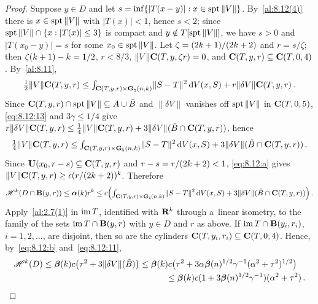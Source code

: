 \begin{proof}
    Suppose $y \in D$ and let $s = \inf \{ |T(x - y)| : x \in \operatorname{spt} \|V\| \}$. By~\ref{al:8.12(4)}
    there is $x \in \operatorname{spt} \|V\|$ with $|T(x)| < 1$, hence $s < 2$; since $\operatorname{spt} \|V\| \cap \{ x :
    |T(x)| \le 3 \}$ is compact and $y \notin T[\operatorname{spt} \|V\|]$, we have $s > 0$ and $|T(x_0 - y)| =
    s$ for some $x_0 \in \operatorname{spt} \|V\|$. Let $\zeta = (2k + 1)/(2 k + 2)$ and $r = s / \zeta$;
    then $\zeta (k + 1) - k = 1/2$, $r < 8/3$, $\|V\| \mathbf{C} ( T, y, \zeta r ) = 0$, and
    $\mathbf{C} ( T, y, r ) \subseteq \mathbf{C} ( T, 0, 4 )$. By~\ref{al:8.11},
    \begin{displaymath}
        \tfrac12 \|V\| \mathbf{C} ( T, y, r ) \le {\textstyle\int_{\mathbf{C} ( T, y, r ) \times
        \mathbf{G}_{\natural}(n,k)}^{}} \|S - T\|^2 \,\mathrm{d} V(x,S) + r \|\delta V\| \mathbf{C} ( T, y, r ) \,.
    \end{displaymath}
    Since $\mathbf{C} ( T, y, r ) \cap \operatorname{spt} \|V\| \subseteq A \cup \tilde B$ and $\|\delta V\|$ vanishes
    off $\operatorname{spt} \|V\|$ in $\mathbf{C} ( T, 0, 5 )$, \eqref{eq:8.12:13} and $3 \gamma \le 1/4$ give $r
    \|\delta V\| \mathbf{C} ( T, y, r ) \le \frac14 \|V\| \mathbf{C} ( T, y, r ) + 3 \|\delta V\|(\tilde B \cap
    \mathbf{C} ( T, y, r ))$, hence
    \begin{displaymath}
        \tfrac14 \|V\| \mathbf{C} ( T, y, r ) \le {\textstyle\int_{\mathbf{C} ( T, y, r ) \times
        \mathbf{G}_{\natural}(n,k)}^{}} \|S - T\|^2 \,\mathrm{d} V(x,S) + 3 \|\delta V\|(\tilde B \cap
        \mathbf{C} ( T, y, r )) \,.
    \end{displaymath}
    Since $\mathbf{U}(x_0,r - s) \subseteq \mathbf{C} ( T, y, r )$ and $r - s = r / (2 k + 2) < 1$,
    \eqref{eq:8.12:a} gives $\|V\| \mathbf{C} ( T, y, r ) \ge \epsilon (r / (2 k + 2))^{k}$.
    Therefore
    \begin{displaymath}
        \mathscr{H}^{k}(D \cap \mathbf{B}(y,r)) \le \boldsymbol{\alpha}(k) r^{k} \le c \Big(
        {\textstyle\int_{\mathbf{C} ( T, y, r ) \times \mathbf{G}_{\natural}(n,k)}^{}} \|S - T\|^2 \,\mathrm{d} V(x,S) + 3 \|\delta
        V\|(\tilde B \cap \mathbf{C} ( T, y, r )) \Big) \,.
    \end{displaymath}
    Apply~\ref{al:2.7(1)} in $\operatorname{im} T$, identified with $\mathbf{R}^{k}$ through a~linear isometry, to the
    family of the sets $\operatorname{im} T \cap \mathbf{B}(y,r)$ with $y \in D$ and $r$ as above. If $\operatorname{im} T \cap
    \mathbf{B}(y_i,r_i)$, $i = 1, 2, \ldots$, are disjoint, then so are the cylinders
    $\mathbf{C} ( T, y_i, r_i ) \subseteq \mathbf{C} ( T, 0, 4 )$. Hence, by~\eqref{eq:8.12:b}
    and~\eqref{eq:8.12:11},
    \begin{equation}
        \label{eq:8.12:16}
        \begin{multlined}
        \HM^{\vdim}(D) \le \besicovitch{\vdim} c \big( \tau^2 + 3 \|\delta V\|(\tilde B) \big) \le
        \besicovitch{\vdim} c \big( \tau^2 + 3 \alpha \besicovitch{\adim}^{1/2} \gamma^{-1}
        (\alpha^2 + \tau^2)^{1/2} \big) \\ \le \besicovitch{\vdim} c (1 + 3 \besicovitch{\adim}^{1/2}
        \gamma^{-1}) (\alpha^2 + \tau^2) \,.
        \end{multlined}
    \end{equation}


\end{proof}
